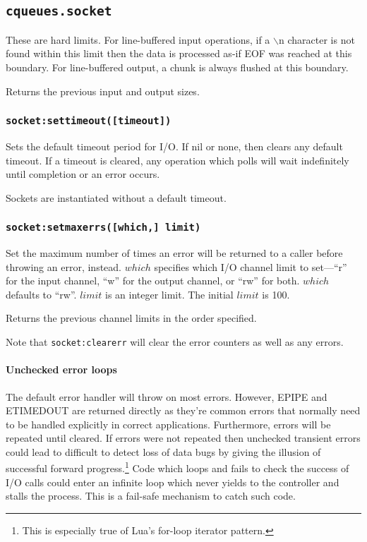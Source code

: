 \documentclass[11pt, oneside]{memoir}
\newcommand{\fn}[1]{\texttt{#1} }
\newcommand{\lf}[0]{$\backslash$n }
\newcounter{toccols}
\newenvironment{Module}[1]{
	\subsection{\texttt{#1}}
	\addtocontents{toc}{
		\protect\begin{multicols}{\value{toccols}}
	}
}{
	\addtocontents{toc}{\protect\end{multicols}}
}
\begin{document}
\begin{Module}{cqueues.socket}
These are hard limits. For line-buffered input operations, if a \lf character is not found within this limit then the data is processed as-if EOF was reached at this boundary. For line-buffered output, a chunk is always flushed at this boundary.

Returns the previous input and output sizes.

\subsubsection[\fn{socket:settimeout}]{\fn{socket:settimeout([timeout])}}

Sets the default timeout period for I/O. If nil or none, then clears any default timeout. If a timeout is cleared, any operation which polls will wait indefinitely until completion or an error occurs.

Sockets are instantiated without a default timeout.

\subsubsection[\fn{socket:setmaxerrs}]{\fn{socket:setmaxerrs([which,] limit)}}

Set the maximum number of times an error will be returned to a caller before throwing an error, instead. $which$ specifies which I/O channel limit to set---``r'' for the input channel, ``w'' for the output channel, or ``rw'' for both. $which$ defaults to ``rw''. $limit$ is an integer limit. The initial $limit$ is 100.

Returns the previous channel limits in the order specified.

Note that \fn{socket:clearerr} will clear the error counters as well as any errors.

\paragraph{Unchecked error loops} The default error handler will throw on most errors. However, EPIPE and ETIMEDOUT are returned directly as they're common errors that normally need to be handled explicitly in correct applications. Furthermore, errors will be repeated until cleared. If errors were not repeated then unchecked transient errors could lead to difficult to detect loss of data bugs by giving the illusion of successful forward progress.\footnote{This is especially true of Lua's for-loop iterator pattern.} Code which loops and fails to check the success of I/O calls could enter an infinite loop which never yields to the controller and stalls the process. This is a fail-safe mechanism to catch such code.


\end{Module}
\end{document}
